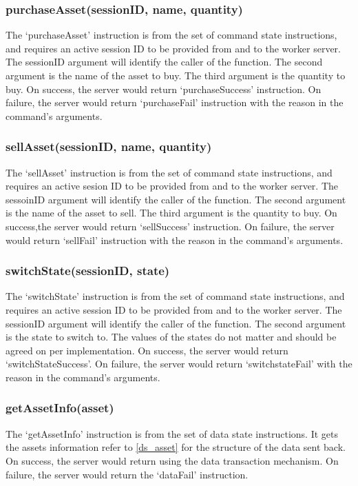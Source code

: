 \documentclass[a4paper]{article}
\begin{document}
\subsubsection{purchaseAsset(sessionID, name, quantity)}
\label{protocol_inst_purchase}
The `purchaseAsset' instruction is from the set of command state instructions,
and requires an active session ID to be provided from and to the worker server.
The sessionID argument will identify the caller of the function. The second
argument is the name of the asset to buy. The third argument is the quantity to
buy. On success, the server would return `purchaseSuccess' instruction. On
failure, the server would return `purchaseFail' instruction with the reason
in the command's arguments.

\subsubsection{sellAsset(sessionID, name, quantity)}
\label{protocol_inst_sellasset}
The `sellAsset' instruction is from the set of command state instructions, and
requires an active sesion ID to be provided from and to the worker server. The
sessoinID argument will identify the caller of the function. The second
argument is the name of the asset to sell. The third argument is the quantity
to buy. On success,the server would return `sellSuccess' instruction. On
failure, the server would return `sellFail' instruction with the reason in
the command's arguments.

\subsubsection{switchState(sessionID, state)}
\label{protocol_inst_switchstate}
The `switchState' instruction is from the set of command state instructions,
and requires an active session ID to be provided from and to the worker server.
The sessionID argument will identify the caller of the function. The second
argument is the state to switch to. The values of the states do not matter and
should be agreed on per implementation. On success, the server would return 
`switchStateSuccess'. On failure, the server would return `switchstateFail'
with the reason in the command's arguments.

\subsubsection{getAssetInfo(asset)}
\label{protocol_inst_getassetinfo}
The `getAssetInfo' instruction is from the set of data state instructions. It
gets the assets information refer to \ref{ds_asset} for the structure of the
data sent back. On success, the server would return using the data transaction
mechanism. On failure, the server would return the `dataFail' instruction.
\end{document}
